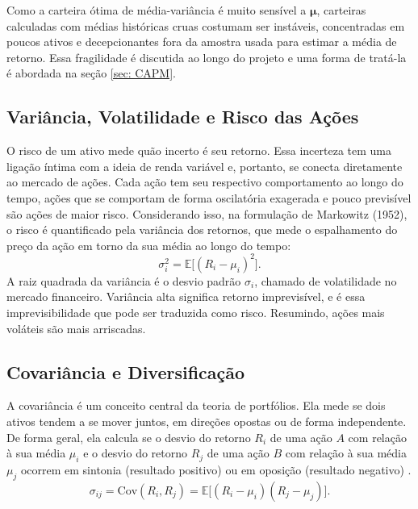 \documentclass[12pt,a4paper]{article}
\begin{document}
Como a carteira ótima de média-variância \cite{markowitz1952portfolio} é muito sensível a $\boldsymbol{\mu}$, carteiras calculadas com médias históricas cruas costumam ser instáveis, concentradas em poucos ativos e decepcionantes fora da amostra usada para estimar a média de retorno. Essa fragilidade é discutida ao longo do projeto e uma forma de tratá-la é abordada na seção \ref{sec: CAPM}.

\subsection{Variância, Volatilidade e Risco das Ações}

O risco de um ativo mede quão incerto é seu retorno. Essa incerteza tem uma ligação íntima com a ideia de renda variável e, portanto, se conecta diretamente ao mercado de ações. Cada ação tem seu respectivo comportamento ao longo do tempo, ações que se comportam de forma oscilatória exagerada e pouco previsível são ações de maior risco. Considerando isso, na formulação de Markowitz (1952), o risco é quantificado pela variância dos retornos, que mede o espalhamento do preço da ação em torno da sua média ao longo do tempo:
\begin{equation}
\sigma_i^2 = \mathbb{E}\big[(R_i - \mu_i)^2\big].
\end{equation}
A raiz quadrada da variância é o desvio padrão $\sigma_i$, chamado de volatilidade no mercado financeiro. Variância alta significa retorno imprevisível, e é essa imprevisibilidade que pode ser traduzida como risco. Resumindo, ações mais voláteis são mais arriscadas.

\subsection{Covariância e Diversificação}

A covariância é um conceito central da teoria de portfólios. Ela mede se dois ativos tendem a se mover juntos, em direções opostas ou de forma independente. De forma geral, ela calcula se o desvio do retorno $R_i$ de uma ação $A$ com relação à sua média  $\mu_i$ e o desvio do retorno $R_j$ de uma ação $B$ com relação à sua média $\mu_j$ ocorrem em sintonia (resultado positivo) ou em oposição (resultado negativo) \cite{markowitz1952portfolio}.
\begin{equation}
\sigma_{ij} = \mathrm{Cov}(R_i, R_j) = \mathbb{E}\big[(R_i - \mu_i)(R_j - \mu_j)\big].
\end{equation}
\end{document}
